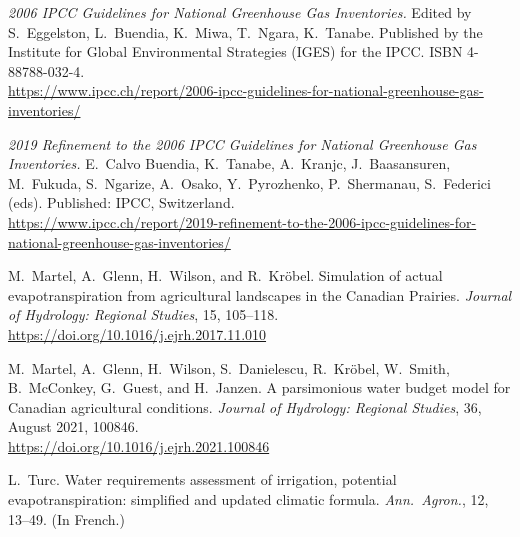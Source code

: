 \begin{description}[leftmargin=0pt, style=nextline]

    \item[IPCC, 2006]
        \textit{2006 IPCC Guidelines for National Greenhouse Gas Inventories.}
        Edited by S.\ Eggelston, L.\ Buendia, K.\ Miwa, T.\ Ngara, K.\ Tanabe.
        Published by the Institute for Global Environmental Strategies (IGES)
        for the IPCC. ISBN 4-88788-032-4.\\
        \url{https://www.ipcc.ch/report/2006-ipcc-guidelines-for-national-greenhouse-gas-inventories/}

    \item[IPCC, 2019]
        \textit{2019 Refinement to the 2006 IPCC Guidelines for National
        Greenhouse Gas Inventories.} E.\ Calvo Buendia, K.\ Tanabe,
        A.\ Kranjc, J.\ Baasansuren, M.\ Fukuda, S.\ Ngarize, A.\ Osako,
        Y.\ Pyrozhenko, P.\ Shermanau, S.\ Federici (eds). Published: IPCC,
        Switzerland.\\
        \url{https://www.ipcc.ch/report/2019-refinement-to-the-2006-ipcc-guidelines-for-national-greenhouse-gas-inventories/}

    \item[Martel et al., 2018]
        M.\ Martel, A.\ Glenn, H.\ Wilson, and R.\ Kröbel.
        Simulation of actual evapotranspiration from agricultural landscapes
        in the Canadian Prairies.
        \textit{Journal of Hydrology: Regional Studies}, 15, 105--118.\\
        \url{https://doi.org/10.1016/j.ejrh.2017.11.010}

    \item[Martel et al., 2021]
        M.\ Martel, A.\ Glenn, H.\ Wilson, S.\ Danielescu, R.\ Kröbel,
        W.\ Smith, B.\ McConkey, G.\ Guest, and H.\ Janzen.
        A parsimonious water budget model for Canadian agricultural conditions.
        \textit{Journal of Hydrology: Regional Studies}, 36, August 2021,
        100846.\\
        \url{https://doi.org/10.1016/j.ejrh.2021.100846}

    \item[Turc, 1961]
        L.\ Turc.
        Water requirements assessment of irrigation, potential
        evapotranspiration: simplified and updated climatic formula.
        \textit{Ann.\ Agron.}, 12, 13--49. (In French.)

\end{description}
